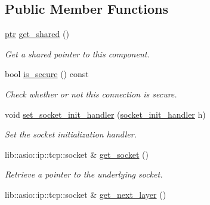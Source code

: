 \subsection*{Public Member Functions}
\begin{DoxyCompactItemize}
\item 
\mbox{\label{classwebsocketpp_1_1transport_1_1asio_1_1basic__socket_1_1connection_ade8aecc68665126f6beb82e74169a96d}} 
\mbox{\hyperlink{classwebsocketpp_1_1transport_1_1asio_1_1basic__socket_1_1connection_a1a4fa6887235c53c7ddd13307798b280}{ptr}} \mbox{\hyperlink{classwebsocketpp_1_1transport_1_1asio_1_1basic__socket_1_1connection_ade8aecc68665126f6beb82e74169a96d}{get\+\_\+shared}} ()
\begin{DoxyCompactList}\small\item\em Get a shared pointer to this component. \end{DoxyCompactList}\item 
bool \mbox{\hyperlink{classwebsocketpp_1_1transport_1_1asio_1_1basic__socket_1_1connection_a747da29816758e8aae89ff36542c7c7d}{is\+\_\+secure}} () const
\begin{DoxyCompactList}\small\item\em Check whether or not this connection is secure. \end{DoxyCompactList}\item 
void \mbox{\hyperlink{classwebsocketpp_1_1transport_1_1asio_1_1basic__socket_1_1connection_a2ea605a8c2ed46812057b36b7a0ddf6a}{set\+\_\+socket\+\_\+init\+\_\+handler}} (\mbox{\hyperlink{namespacewebsocketpp_1_1transport_1_1asio_1_1basic__socket_a88f9c59fa40db3188769162db98edb93}{socket\+\_\+init\+\_\+handler}} h)
\begin{DoxyCompactList}\small\item\em Set the socket initialization handler. \end{DoxyCompactList}\item 
lib\+::asio\+::ip\+::tcp\+::socket \& \mbox{\hyperlink{classwebsocketpp_1_1transport_1_1asio_1_1basic__socket_1_1connection_ae5026a6893c7bc54be3f7981fceaf849}{get\+\_\+socket}} ()
\begin{DoxyCompactList}\small\item\em Retrieve a pointer to the underlying socket. \end{DoxyCompactList}\item 
lib\+::asio\+::ip\+::tcp\+::socket \& \mbox{\hyperlink{classwebsocketpp_1_1transport_1_1asio_1_1basic__socket_1_1connection_aad9f1b8fec827bc502f450cbf2c0d583}{get\+\_\+next\+\_\+layer}} ()

\end{DoxyCompactItemize}
